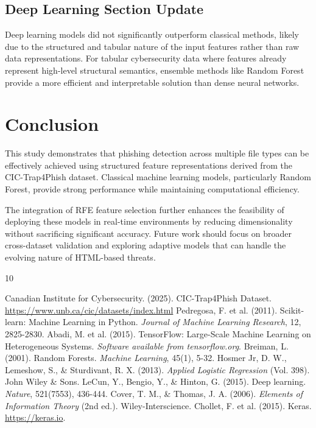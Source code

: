 \documentclass[12pt,a4paper]{article}
\begin{document}
\subsection{Deep Learning Section Update}
Deep learning models did not significantly outperform classical methods, likely due to the structured and tabular nature of the input features rather than raw data representations. For tabular cybersecurity data where features already represent high-level structural semantics, ensemble methods like Random Forest provide a more efficient and interpretable solution than dense neural networks.

\section{Conclusion}
This study demonstrates that phishing detection across multiple file types can be effectively achieved using structured feature representations derived from the CIC-Trap4Phish dataset. Classical machine learning models, particularly Random Forest, provide strong performance while maintaining computational efficiency.

The integration of RFE feature selection further enhances the feasibility of deploying these models in real-time environments by reducing dimensionality without sacrificing significant accuracy. Future work should focus on broader cross-dataset validation and exploring adaptive models that can handle the evolving nature of HTML-based threats.

\begin{thebibliography}{10}

Canadian Institute for Cybersecurity. (2025). CIC-Trap4Phish Dataset. \url{https://www.unb.ca/cic/datasets/index.html}
Pedregosa, F. et al. (2011). Scikit-learn: Machine Learning in Python. \textit{Journal of Machine Learning Research}, 12, 2825-2830.
Abadi, M. et al. (2015). TensorFlow: Large-Scale Machine Learning on Heterogeneous Systems. \textit{Software available from tensorflow.org}.
Breiman, L. (2001). Random Forests. \textit{Machine Learning}, 45(1), 5-32.
Hosmer Jr, D. W., Lemeshow, S., \& Sturdivant, R. X. (2013). \textit{Applied Logistic Regression} (Vol. 398). John Wiley \& Sons.
LeCun, Y., Bengio, Y., \& Hinton, G. (2015). Deep learning. \textit{Nature}, 521(7553), 436-444.
Cover, T. M., \& Thomas, J. A. (2006). \textit{Elements of Information Theory} (2nd ed.). Wiley-Interscience.
Chollet, F. et al. (2015). Keras. \url{https://keras.io}.
\end{thebibliography}
\end{document}
